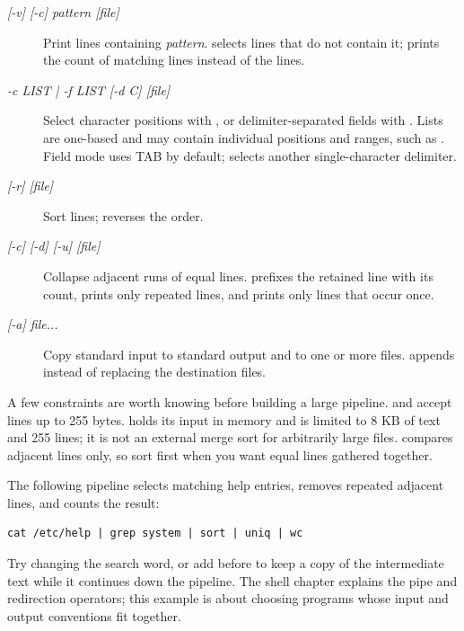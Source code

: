 \begin{description}
  \item[ \textit{[-v] [-c] pattern [file]}] Print lines containing \textit{pattern}.  selects lines that do not contain it;  prints the count of matching lines instead of the lines.
  \item[ \textit{-c LIST | -f LIST [-d C] [file]}] Select character positions with , or delimiter-separated fields with . Lists are one-based and may contain individual positions and ranges, such as . Field mode uses TAB by default;  selects another single-character delimiter.
  \item[ \textit{[-r] [file]}] Sort lines;  reverses the order.
  \item[ \textit{[-c] [-d] [-u] [file]}] Collapse adjacent runs of equal lines.  prefixes the retained line with its count,  prints only repeated lines, and  prints only lines that occur once.
  \item[ \textit{[-a] file...}] Copy standard input to standard output and to one or more files.  appends instead of replacing the destination files.
\end{description}

A few constraints are worth knowing before building a large pipeline.  and  accept lines up to 255 bytes.  holds its input in memory and is limited to 8 KB of text and 255 lines; it is not an external merge sort for arbitrarily large files.  compares adjacent lines only, so sort first when you want equal lines gathered together.

\begin{trythis}
The following pipeline selects matching help entries, removes repeated adjacent lines, and counts the result:

\begin{lstlisting}
cat /etc/help | grep system | sort | uniq | wc
\end{lstlisting}

Try changing the search word, or add  before  to keep a copy of the intermediate text while it continues down the pipeline. The shell chapter explains the pipe and redirection operators; this example is about choosing programs whose input and output conventions fit together.
\end{trythis}

